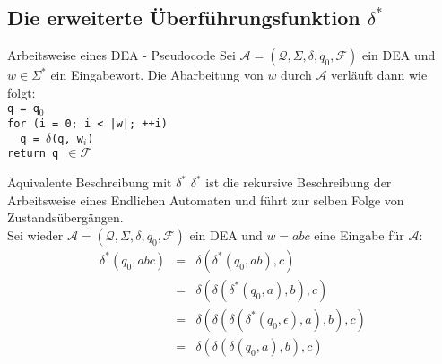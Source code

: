 \documentclass[]{beamer}
\begin{document}
\subsection{Die erweiterte Überführungsfunktion $\delta^*$}
\begin{frame}[squeeze]{}
  \vspace*{-0.25em}
  \begin{block}{Arbeitsweise eines DEA - Pseudocode}
    Sei $\mathcal{A} = \left( \mathcal{Q}, \Sigma, \delta, q_0, \mathcal{F} \right)$ ein DEA und $w \in \Sigma^*$ ein Eingabewort. Die Abarbeitung von $w$ durch $\mathcal{A}$ verläuft dann wie folgt: \\
    \vspace*{0.5em}
    \texttt{q = q$_0$} \\
    \texttt{for (i = 0; i < |w|;  ++i)} \\
    \texttt{\ \ q = $\delta$(q, w$_i$)} \\
    \texttt{return q $\in \mathcal{F}$}
  \end{block}
  
  \vspace*{-0.5em}
  \pause
  
  \begin{block}{Äquivalente Beschreibung mit $\delta^*$}
    $\delta^*$ ist die rekursive Beschreibung der Arbeitsweise eines Endlichen Automaten und führt zur selben Folge von Zustandsübergängen. \\
    \vspace*{0.5em}
    Sei wieder $\mathcal{A} = \left( \mathcal{Q}, \Sigma, \delta, q_0, \mathcal{F} \right)$ ein DEA und $w = abc$ eine Eingabe für $\mathcal{A}$:
    \vspace*{-0.25em}
    \begin{eqnarray*}
      \delta^* \left( q_0, abc \right) & = & \delta \left( \delta^* \left( q_0, ab \right), c \right) \\
                                       & = & \delta \left( \delta \left( \delta^* \left( q_0, a \right), b \right), c \right) \\
                                       & = & \delta \left( \delta \left( \delta \left( \delta^* \left( q_0, \epsilon \right), a \right), b \right), c \right) \\
                                       & = & \delta \left( \delta \left( \delta \left( q_0, a \right), b \right), c \right)
    \end{eqnarray*}
  \end{block}
\end{frame}
\end{document}
